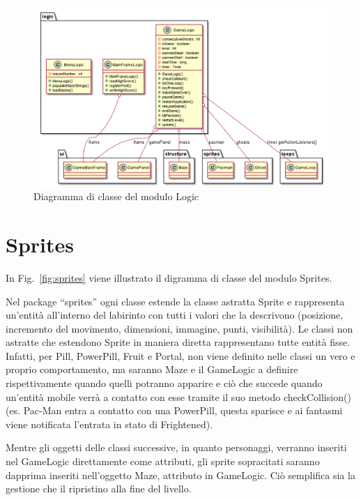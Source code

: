 \documentclass[12pt,a4paper]{report}
\begin{document}
\begin{figure}[tb]
  \includegraphics[width=\linewidth]{logic}
  \caption{Diagramma di classe del modulo Logic}
  \label{fig:logic}
\end{figure}


\section{Sprites}\label{se:arch.sprites}
In Fig.~\ref{fig:sprites} viene illustrato il digramma di classe del modulo Sprites.\newline

Nel package “sprites” ogni classe estende la classe astratta Sprite e rappresenta un’entità all’interno del labirinto con tutti i valori che la descrivono (posizione, incremento del movimento, dimensioni, immagine, punti, visibilità). Le classi non astratte che estendono Sprite in maniera diretta rappresentano tutte entità fisse. Infatti, per Pill, PowerPill, Fruit e Portal, non viene definito nelle classi un vero e proprio comportamento, ma saranno Maze e il GameLogic a definire rispettivamente quando quelli potranno apparire e ciò che succede quando un’entità mobile verrà a contatto con esse tramite il suo metodo checkCollision() (es. Pac-Man entra a contatto con una PowerPill, questa sparisce e ai fantasmi viene notificata l’entrata in stato di Frightened).

Mentre gli oggetti delle classi successive, in quanto personaggi, verranno inseriti nel GameLogic direttamente come attributi, gli sprite sopracitati saranno dapprima inseriti nell’oggetto Maze, attributo in GameLogic. Ciò semplifica sia la gestione che il ripristino alla fine del livello.
\end{document}
